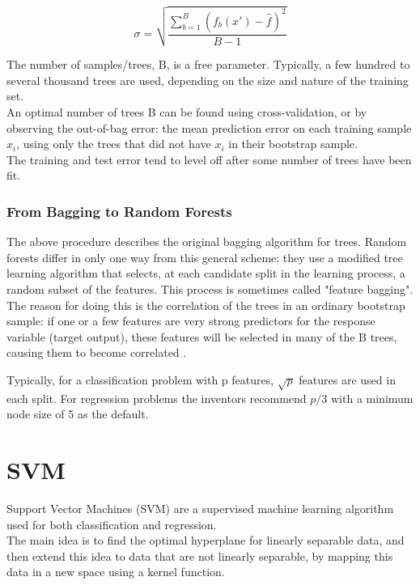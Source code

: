 \begin{equation}
	{\sigma ={\sqrt {\frac {\sum_{b=1}^{B}(f_{b}(x')-{\hat {f}})^{2}}{B-1}}}}
\end{equation}

The number of samples/trees, B, is a free parameter. Typically, a few hundred to several thousand trees are used, depending on the size and nature of the training set. \\
An optimal number of trees B can be found using cross-validation, or by observing the out-of-bag error: the mean prediction error on each training sample $x_i$, using only the trees that did not have $x_i$ in their bootstrap sample. \\
The training and test error tend to level off after some number of trees have been fit.

\subsubsection{From Bagging to Random Forests}

The above procedure describes the original bagging algorithm for trees. Random forests differ in only one way from this general scheme: they use a modified tree learning algorithm that selects, at each candidate split in the learning process, a random subset of the features. This process is sometimes called "feature bagging". The reason for doing this is the correlation of the trees in an ordinary bootstrap sample: if one or a few features are very strong predictors for the response variable (target output), these features will be selected in many of the B trees, causing them to become correlated \cite{ESL}. 

Typically, for a classification problem with p features, $\sqrt{p}$ features are used in each split. For regression problems the inventors recommend $p/3$ with a minimum node size of 5 as the default.



\pagebreak

\section{SVM} \label{svm}
Support Vector Machines (SVM) are a supervised machine learning algorithm used for both classification and regression. \\

The main idea is to find the optimal hyperplane for linearly separable data, and then extend this idea to data that are not linearly separable, by mapping this data in a new space using a kernel function.\\

